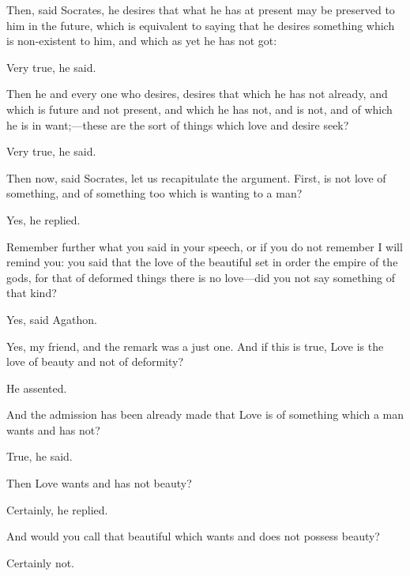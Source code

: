 \documentclass[11pt,letter]{article}
\begin{document}
\par  Then, said Socrates, he desires that what he has at present may be preserved to him in the future, which is equivalent to saying that he desires something which is non-existent to him, and which as yet he has not got:

\par  Very true, he said.

\par  Then he and every one who desires, desires that which he has not already, and which is future and not present, and which he has not, and is not, and of which he is in want;—these are the sort of things which love and desire seek?

\par  Very true, he said.

\par  Then now, said Socrates, let us recapitulate the argument. First, is not love of something, and of something too which is wanting to a man?

\par  Yes, he replied.

\par  Remember further what you said in your speech, or if you do not remember I will remind you: you said that the love of the beautiful set in order the empire of the gods, for that of deformed things there is no love—did you not say something of that kind?

\par  Yes, said Agathon.

\par  Yes, my friend, and the remark was a just one. And if this is true, Love is the love of beauty and not of deformity?

\par  He assented.

\par  And the admission has been already made that Love is of something which a man wants and has not?

\par  True, he said.

\par  Then Love wants and has not beauty?

\par  Certainly, he replied.

\par  And would you call that beautiful which wants and does not possess beauty?

\par  Certainly not.
\end{document}
